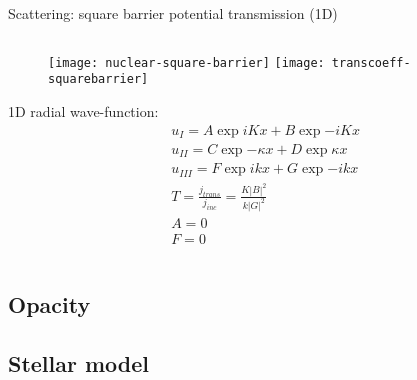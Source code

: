 \begin{frame}{Scattering: square barrier potential transmission (1D)}
\begin{columns}[T]
\begin{column}{0.25\textwidth}
\begin{figure}[!ht]
                \texttt{[image: nuclear-square-barrier]}\label{fig:nuclear-square-barrier}
                \texttt{[image: transcoeff-squarebarrier]}\label{fig:transcoeff-squarebarrier}
			\end{figure}
            1D radial wave-function:
            \begin{align*}
                &u_I=A\exp{iKx}+B\exp{-iKx}\\
                &u_{II}=C\exp{-\kappa x}+D\exp{\kappa x}\\
                &u_{III}=F\exp{ikx}+G\exp{-ikx}\\
                &T=\frac{j_{trans}}{j_{inc}}=\frac{K|B|^2}{k|G|^2}\\
                &A=0\tag{no wave from left}\\
                &F=0
            \end{align*}
        \end{column}
    \end{columns}
    
\end{frame}

\subsection{Opacity}

\subsection{Stellar model}

